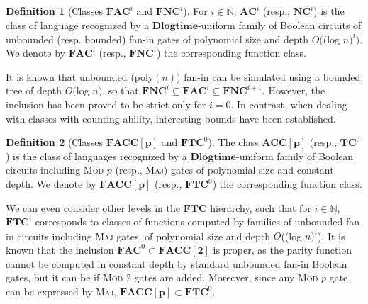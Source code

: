 \documentclass[11pt, oneside]{article}
\newcommand{\Nat}{\mathbb{N}}
\newcommand{\NC}{\mathbf{FNC}}
\newcommand{\AC}{\mathbf{FAC}}
\newcommand{\TC}{\mathbf{FTC}}
\newcommand{\FACC}{\mathbf{FACC[2]}}
\theoremstyle{definition}
\newtheorem{defn}{Definition}
\begin{document}
\begin{defn}[Classes $\AC^i$ and $\NC^i$]
    For $i\in \Nat$, %
    $\mathbf{AC}^i$ (resp., $\mathbf{NC}^i$) is the class of language recognized by a $\mathbf{Dlogtime}$-uniform family of Boolean circuits of unbounded (resp. bounded) fan-in gates of polynomial size and depth $O(($log $n)^i)$.
    We denote by $\AC^i$ (resp., $\NC^i$) the corresponding function class.
\end{defn}
\noindent 
It is known that unbounded (poly$(n)$) fan-in can be simulated using a bounded tree of depth $O($log $n)$, so that $\NC^i \subseteq \AC^i \subseteq \NC^{i+1}$.
%
However, the inclusion has been proved to be strict only for $i=0$.
%
%
In contrast, when dealing with classes with counting ability, interesting bounds have been established. 

\begin{defn}[Classes $\mathbf{FACC[p]}$ and $\TC^0$]
    The class $\mathbf{ACC[p]}$ (resp., $\mathbf{TC}^0$) is the class of languages recognized by a $\mathbf{Dlogtime}$-uniform family of Boolean circuits including \textsc{Mod $p$} (resp., \textsc{Maj}) gates of polynomial size and constant depth.
    We denote by $\mathbf{FACC[p]}$ (resp., $\TC^0$) the corresponding function class.
\end{defn}
\noindent
We can even consider other levels in the $\TC$ hierarchy, such that for $i\in \Nat$, $\TC^i$ corresponds to classes of functions computed by families of unbounded fan-in circuits including \textsc{Maj} gates, of polynomial size and depth $O$((log $n)^i$).
%
%
It is known that the inclusion $\AC^0 \subset \FACC$ is proper, as the parity function cannot be computed in constant depth by standard unbounded fan-in Boolean gates, but it can be if \textsc{Mod 2} gates are added. 
%
Moreover, since any \textsc{Mod $p$} gate can be expressed by \textsc{Maj}, $\mathbf{FACC[p]}\subset \TC^0$.
\end{document}
